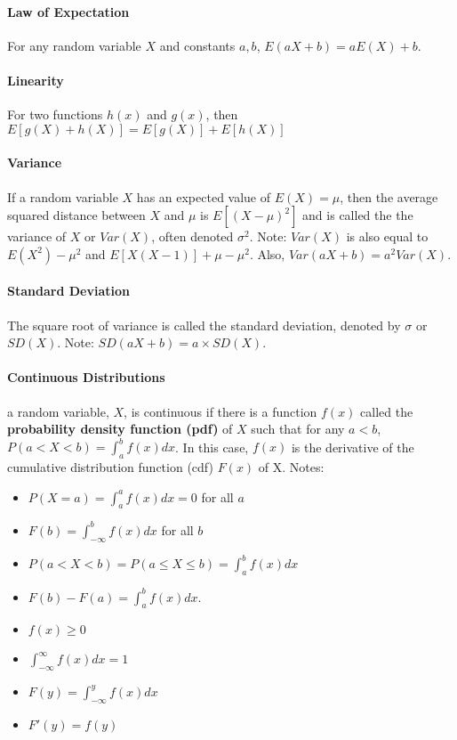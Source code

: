 \documentclass[10pt,letter]{article}
\begin{document}
\paragraph{Law of Expectation} For any random variable $X$ and constants $a,b$, $E(aX+b)=aE(X)+b$. 

\paragraph{Linearity} For two functions $h(x)$ and $g(x)$, then $E[g(X)+h(X)]=E[g(X)]+E[h(X)]$

\paragraph{Variance} If a random variable $X$ has an expected value of $E(X)=\mu$, then the average squared distance between $X$ and $\mu$ is $E[(X-\mu)^2]$ and is called the the variance of $X$ or $Var(X)$, often denoted $\sigma^2$. Note: $Var(X)$ is also equal to $E(X^2)-\mu^2$ and $E[X(X-1)]+\mu-\mu^2$. Also, $Var(aX+b)=a^2Var(X)$. 

\paragraph{Standard Deviation} The square root of variance is called the standard deviation, denoted by $\sigma$ or $SD(X)$. Note: $SD(aX+b)=a\times SD(X)$.

\paragraph{Continuous Distributions} a random variable, $X$, is continuous if there is a function $f(x)$ called the \textbf{probability density function (pdf)} of $X$ such that for any $a<b$, $P(a<X<b)=\int_a^bf(x)dx$. In this case, $f(x)$ is the derivative of the cumulative distribution function (cdf) $F(x)$ of X. Notes: \begin{itemize}
    \item $P(X=a)=\int_a^af(x)dx = 0$ for all $a$ 
    \item $F(b) = \int_{-\infty}^b f(x)dx$ for all $b$ 
    \item $P(a<X<b)=P(a\leq X\leq b) = \int_a^bf(x)dx$
    \item $F(b) - F(a) = \int_a^b f(x)dx$. 
    \item $f(x)\geq 0$
    \item $\int_{-\infty}^\infty f(x)dx = 1$
    \item $F(y)=\int_{-\infty}^y f(x)dx$
    \item $F'(y)=f(y)$
\end{itemize}
\end{document}
